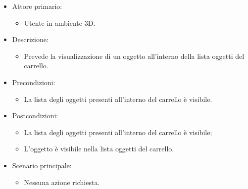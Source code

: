\begin{itemize}
	
	\item Attore primario: 
	\begin{itemize}
		\item Utente in ambiente 3D.
	\end{itemize}
	\item Descrizione:
	\begin{itemize}
		\item Prevede la visualizzazione di un oggetto all'interno della lista oggetti del carrello.
	\end{itemize}
	
	\item Precondizioni:
	\begin{itemize}
		\item La lista degli oggetti presenti all'interno del carrello è visibile.
	\end{itemize}
	
	\item Postcondizioni:
	\begin{itemize}
		\item La lista degli oggetti presenti all'interno del carrello è visibile;
		\item L'oggetto è visibile nella lista oggetti del carrello.
	\end{itemize}
	
	\item Scenario principale:
	\begin{itemize}
		\item Nessuna azione richiesta.
	\end{itemize}
	
\end{itemize}

